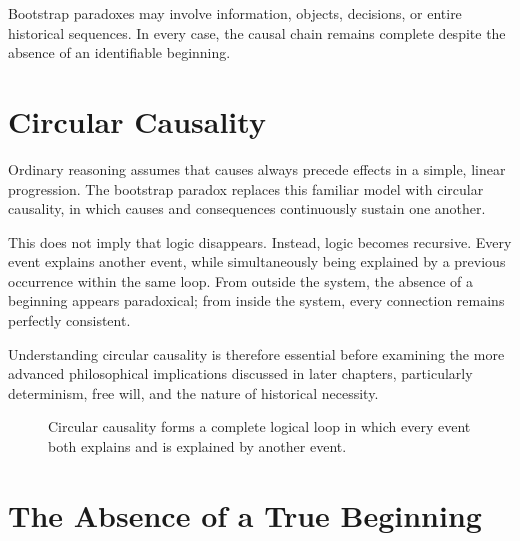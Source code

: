 \documentclass[12pt,oneside,openany]{book}
\begin{document}
\begin{tcolorbox}[colback=green!6,colframe=green!50!black,title=Key Concept]
Bootstrap paradoxes may involve information, objects, decisions, or entire
historical sequences. In every case, the causal chain remains complete despite
the absence of an identifiable beginning.
\end{tcolorbox}

\section{Circular Causality}

Ordinary reasoning assumes that causes always precede effects in a simple,
linear progression. The bootstrap paradox replaces this familiar model with
circular causality, in which causes and consequences continuously sustain one
another.

This does not imply that logic disappears. Instead, logic becomes recursive.
Every event explains another event, while simultaneously being explained by a
previous occurrence within the same loop. From outside the system, the absence
of a beginning appears paradoxical; from inside the system, every connection
remains perfectly consistent.

Understanding circular causality is therefore essential before examining the
more advanced philosophical implications discussed in later chapters,
particularly determinism, free will, and the nature of historical necessity.
\begin{figure}[H]
\centering
{}
\caption{Circular causality forms a complete logical loop in which every event both explains and is explained by another event.}
\end{figure}

\section{The Absence of a True Beginning}
\end{document}
